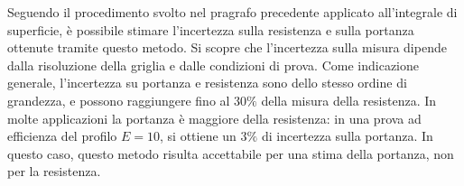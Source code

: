 Seguendo il procedimento svolto nel pragrafo precedente applicato all'integrale di superficie, è possibile
 stimare l'incertezza sulla resistenza e sulla portanza ottenute tramite questo metodo.
Si scopre che l'incertezza sulla misura dipende dalla risoluzione della griglia e dalle condizioni
 di prova. Come indicazione generale, l'incertezza su portanza e resistenza sono dello stesso
 ordine di grandezza, e possono raggiungere fino al $30\%$ della misura della resistenza.
In molte applicazioni la portanza è maggiore della resistenza: in una prova ad efficienza del 
 profilo $E=10$, si ottiene un $3\%$ di incertezza sulla portanza.
In questo caso, questo metodo risulta accettabile per una stima della portanza, non per la resistenza.





